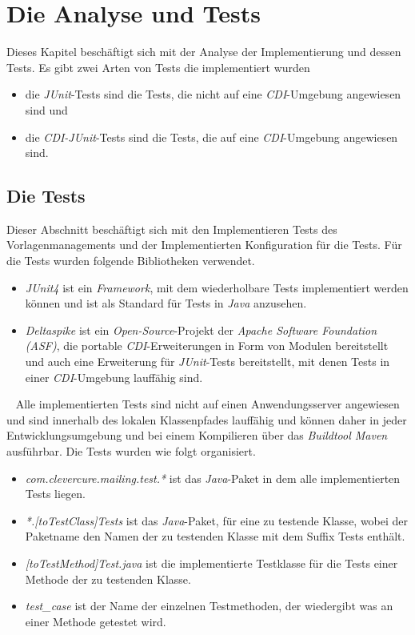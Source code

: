 \chapter{Die Analyse und Tests}
\label{cha:Analyse}
Dieses Kapitel beschäftigt sich mit der Analyse der Implementierung und dessen Tests. Es gibt zwei Arten von Tests die implementiert wurden
\begin{itemize}
	\item die \emph{JUnit}-Tests sind die Tests, die nicht auf eine \emph{CDI}-Umgebung angewiesen sind und 
	\item die \emph{CDI-JUnit}-Tests sind die Tests, die auf eine \emph{CDI}-Umgebung angewiesen sind.
\end{itemize}

\section{Die Tests}
Dieser Abschnitt beschäftigt sich mit den Implementieren Tests des Vorlagenmanagements und der Implementierten Konfiguration für die Tests. Für die Tests wurden folgende Bibliotheken verwendet.
\begin{itemize}
	\item\emph{JUnit4} ist ein \emph{Framework}, mit dem wiederholbare Tests implementiert werden können und ist als Standard für Tests in \emph{Java} anzusehen.
	\item\emph{Deltaspike} ist ein \emph{Open-Source}-Projekt der \emph{Apache Software Foundation (ASF)}, die portable \emph{CDI}-Erweiterungen in Form von Modulen bereitstellt und auch eine Erweiterung für \emph{JUnit}-Tests bereitstellt, mit denen Tests in einer \emph{CDI}-Umgebung lauffähig sind.
\end{itemize}
\ \newline
Alle implementierten Tests sind nicht auf einen Anwendungsserver angewiesen und sind innerhalb des lokalen Klassenpfades lauffähig und können daher in jeder Entwicklungsumgebung und bei einem Kompilieren über das \emph{Buildtool Maven} ausführbar.
\newline
\newline
Die Tests wurden wie folgt organisiert.
\begin{itemize}
	\item\emph{com.clevercure.mailing.test.*} 
	\newline
	ist das \emph{Java}-Paket in dem alle implementierten Tests liegen. 
	\item\emph{*.[toTestClass]Tests}
	\newline
	ist das \emph{Java}-Paket, für eine zu testende Klasse, wobei der Paketname den Namen der zu testenden Klasse mit dem Suffix Tests enthält.
	\item\emph{[toTestMethod]Test.java}
	\newline
	ist die implementierte Testklasse für die Tests einer Methode der zu testenden Klasse.
	\item\emph{test\_case}
	\newline
	ist der Name der einzelnen Testmethoden, der wiedergibt was an einer Methode getestet wird. 
\end{itemize}
